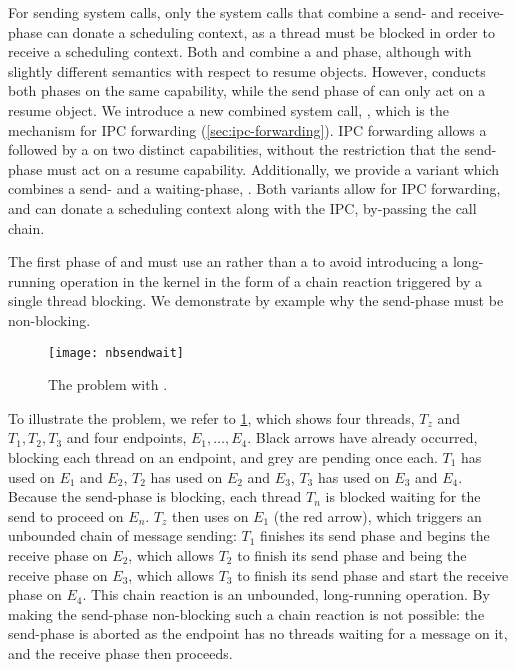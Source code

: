 For sending system calls, only the system calls that combine a send- and receive-phase can donate
a scheduling context, as a thread must be blocked in order to receive a scheduling context. Both
\call and \replyrecv combine a \send and \recv phase, although with slightly different semantics
with respect to resume objects. However, \call conducts both phases on the same capability, while
the send phase of \replyrecv can only act on a resume object. We introduce a new combined system
call, \nbsendrecv, which is the mechanism for IPC forwarding (\cref{sec:ipc-forwarding}). 
IPC forwarding allows a \nbsend followed by a \recv on two distinct capabilities, without the
restriction that the send-phase must act on a resume capability. 
Additionally, we provide a variant which combines a send- and a waiting-phase, \nbsendwait.
Both variants allow for IPC forwarding, and can donate a scheduling context
along with the IPC, by-passing the call chain. 

The first phase of \nbsendrecv and \nbsendwait must use an \nbsend rather than a \send
to avoid introducing a long-running operation in the kernel in the form of a chain reaction
triggered by a single thread blocking. We demonstrate by example why the send-phase must be
non-blocking.

\begin{figure}
    \texttt{[image: nbsendwait]}
    \caption{The problem with \sendrecv.}
    \label{fig:send-wait}
\end{figure}

To illustrate the problem, we refer to \cref{fig:send-wait}, which shows four threads, $T_{z}$ and
$T_{1},T_{2},T_{3}$ and four endpoints, $E_{1},\dots,E_{4}$. Black arrows have already
occurred, blocking each thread on an endpoint, and grey are pending once each. $T_{1}$ has used \sendrecv on
$E_{1}$ and $E_{2}$, $T_{2}$ has used \sendrecv on $E_{2}$ and $E_{3}$,  
$T_{3}$ has used \sendrecv on $E_{3}$ and $E_{4}$. 
Because the send-phase is blocking, each thread $T_{n}$ is blocked waiting for the send to proceed 
on $E_{n}$. $T_{z}$ then uses \recv on $E_{1}$ (the red arrow), which triggers an unbounded chain of message
sending: $T_{1}$ finishes its send phase and begins the receive phase on $E_{2}$, which allows
$T_{2}$ to finish its send phase and being the receive phase on $E_{3}$, which allows $T_{3}$ to
finish its send phase and start the receive phase on $E_{4}$. This chain reaction is an
unbounded, long-running operation. By making the send-phase non-blocking such a chain reaction is not
possible: the send-phase is aborted as the endpoint has no threads waiting for a message on it, and
the receive phase then proceeds. 

